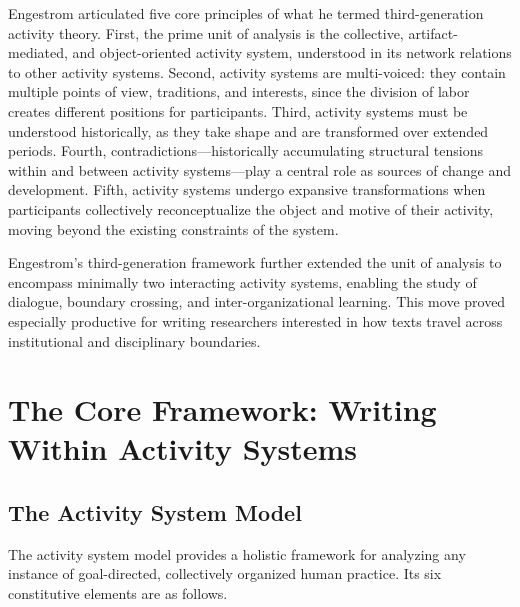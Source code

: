 \documentclass[12pt]{article}
\begin{document}
Engestrom articulated five core principles of what he termed third-generation activity theory. First, the prime unit of analysis is the collective, artifact-mediated, and object-oriented activity system, understood in its network relations to other activity systems. Second, activity systems are multi-voiced: they contain multiple points of view, traditions, and interests, since the division of labor creates different positions for participants. Third, activity systems must be understood historically, as they take shape and are transformed over extended periods. Fourth, contradictions---historically accumulating structural tensions within and between activity systems---play a central role as sources of change and development. Fifth, activity systems undergo expansive transformations when participants collectively reconceptualize the object and motive of their activity, moving beyond the existing constraints of the system.

Engestrom's third-generation framework further extended the unit of analysis to encompass minimally two interacting activity systems, enabling the study of dialogue, boundary crossing, and inter-organizational learning. This move proved especially productive for writing researchers interested in how texts travel across institutional and disciplinary boundaries.

\section{The Core Framework: Writing Within Activity Systems}

\subsection{The Activity System Model}

The activity system model provides a holistic framework for analyzing any instance of goal-directed, collectively organized human practice. Its six constitutive elements are as follows.
\end{document}

